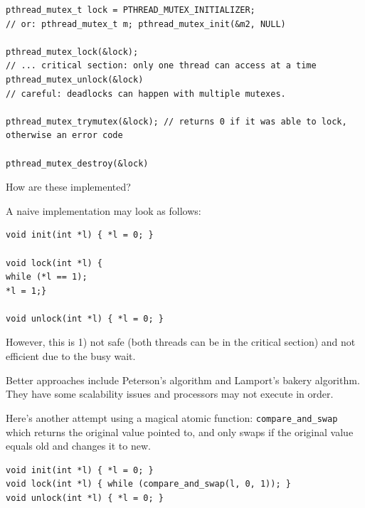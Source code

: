 \documentclass[../notes.tex]{subfiles}
\begin{document}
\begin{listing}[H]
\begin{verbatim}
pthread_mutex_t lock = PTHREAD_MUTEX_INITIALIZER;
// or: pthread_mutex_t m; pthread_mutex_init(&m2, NULL)

pthread_mutex_lock(&lock);
// ... critical section: only one thread can access at a time
pthread_mutex_unlock(&lock)
// careful: deadlocks can happen with multiple mutexes.

pthread_mutex_trymutex(&lock); // returns 0 if it was able to lock, otherwise an error code

pthread_mutex_destroy(&lock)
\end{verbatim}
\end{listing}

How are these implemented?

A naive implementation may look as follows:

\begin{listing}[H]
\begin{verbatim}
void init(int *l) { *l = 0; }

void lock(int *l) {
while (*l == 1);
*l = 1;}

void unlock(int *l) { *l = 0; }
\end{verbatim}
\end{listing}

However, this is 1) not safe (both threads can be in the critical section) and not efficient due to the busy wait.



Better approaches include Peterson's algorithm and Lamport's bakery algorithm. They have some scalability issues and processors may not execute in order.


Here's another attempt using a magical atomic function: \texttt{compare\_and\_swap} which returns the original value pointed to, and only swaps if the original value equals old and changes it to new.

\begin{listing}[H]
\begin{verbatim}
void init(int *l) { *l = 0; }
void lock(int *l) { while (compare_and_swap(l, 0, 1)); }
void unlock(int *l) { *l = 0; }
\end{verbatim}
\end{listing}

\end{document}
